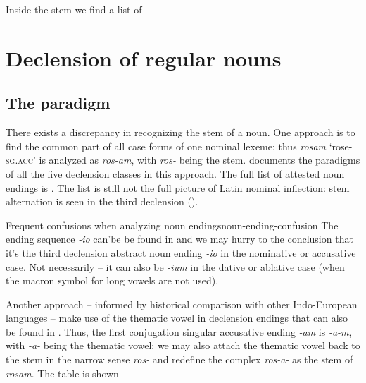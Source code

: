 \documentclass[a4paper, oneside, 12pt]{report}
\newcommand*{\citepage}[1]{p.~{#1}}
\newcommand*{\citepages}[1]{pp.~{#1}}
\newcommand{\form}[1]{\emph{#1}}
\newcommand*{\category}[1]{\textsc{#1}}
\newcommand{\translate}[1]{`#1'}
\begin{document}
Inside the stem we find a list of 

\section{Declension of regular nouns}\label{sec:regular-noun-declension}

\subsection{The paradigm}\label{sec:noun.paradigm.introduction}

There exists a discrepancy in recognizing the stem of a noun.
One approach is to find the common part 
of all case forms of one nominal lexeme;
thus \form{rosam} \translate{rose-\category{sg}.\category{acc}}
is analyzed as \form{ros-am}, 
with \form{ros-} being the stem.
\citet[\citepage{17}]{allen1903allen} documents the paradigms of all the five declension classes 
in this approach.
The full list of attested noun endings is .
The list is still not the full picture of Latin nominal inflection:
stem alternation is seen in the third declension
().

\begin{table}[H]
    \caption{Declension endings; Roman numerals are declension classes}
    \label{tbl:declension-ending-nouns-list}
    \centering
    
\end{table}

\begin{infobox}{Frequent confusions when analyzing noun endings}{noun-ending-confusion}
    The ending sequence \form{-io} can'be be found in 
    and we may hurry to the conclusion 
    that it's the third declension abstract noun ending \form{-io} 
    in the nominative or accusative case.
    Not necessarily -- 
    it can also be \form{-ium} in the dative or ablative case 
    (when the macron symbol for long vowels are not used).
\end{infobox}

Another approach -- informed by historical comparison with other Indo-European languages -- 
make use of the thematic vowel 
in declension endings that can also be found in
\citep[\citepages{45, 63}]{oniga2014latin}.
Thus, the first conjugation singular accusative ending \form{-am} 
is \form{-a-m}, 
with \form{-a-} being the thematic vowel;
we may also attach the thematic vowel back to the stem in the narrow sense \form{ros-} 
and redefine the complex \form{ros-a-} as the stem of \form{rosam}.
The table is shown 
\end{document}

